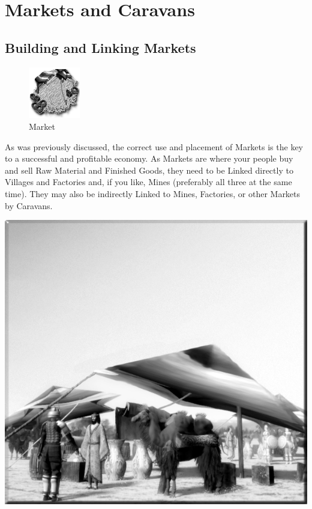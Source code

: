 \section{Markets and Caravans}


\subsection{Building and Linking Markets}

\begin{figure}
	\vspace{-20pt}
	\begin{center}
		\includegraphics[width=0.2\textwidth]{Imarket}
		\\ Market
	\end{center}
	\vspace{-20pt}
\end{figure}


As was previously discussed, the correct use and placement of Markets is the key to a successful and profitable economy. As Markets are where your people buy and sell Raw Material and Finished Goods, they need to be Linked directly to Villages and Factories and, if you like, Mines (preferably all three at the same time). They may also be indirectly Linked to Mines, Factories, or other Markets by Caravans.

\clearpage

\begin{center}
	\includegraphics[width=0.7\linewidth]{Amarket}
\end{center}

